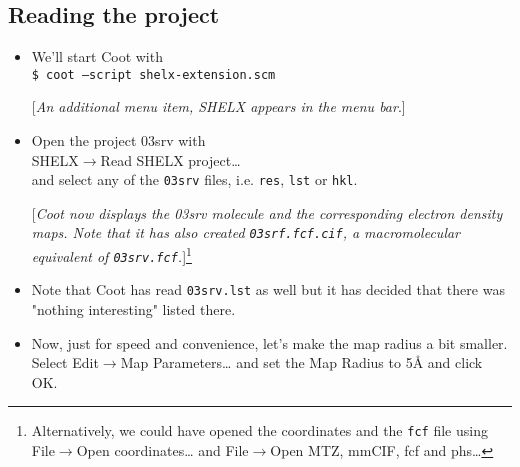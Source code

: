 \documentclass{article}
\begin{document}
\subsection{Reading the project}
\begin{itemize}
\item We'll start Coot with\\\texttt{\$ coot --script shelx-extension.scm}

[\textsl{An additional menu item, SHELX appears in the menu bar}.]

\item Open the project 03srv with\\\textsf{SHELX$\to$Read SHELX project\ldots}\\and select any of the \texttt{03srv} files, i.e. \texttt{res}, \texttt{lst} or \texttt{hkl}.

[\textsl{Coot now displays the 03srv molecule and the corresponding electron density maps. Note that it has also created \texttt{03srf.fcf.cif}, a macromolecular equivalent of \texttt{03srv.fcf}.}]\footnote{Alternatively, we could have opened the coordinates and the \texttt{fcf} file using\\\textsf{File$\to$Open coordinates\ldots} and \textsf{File$\to$Open MTZ, mmCIF, fcf and phs\ldots}}

\item Note that Coot has read \texttt{03srv.lst} as well but it has decided that there was "nothing interesting" listed there.

\item Now, just for speed and convenience, let's make the map radius a bit smaller. Select \textsf{Edit$\to$Map Parameters\ldots} and set the Map Radius to 5{\AA} and click \textsf{OK}.
\end{itemize}
\end{document}
